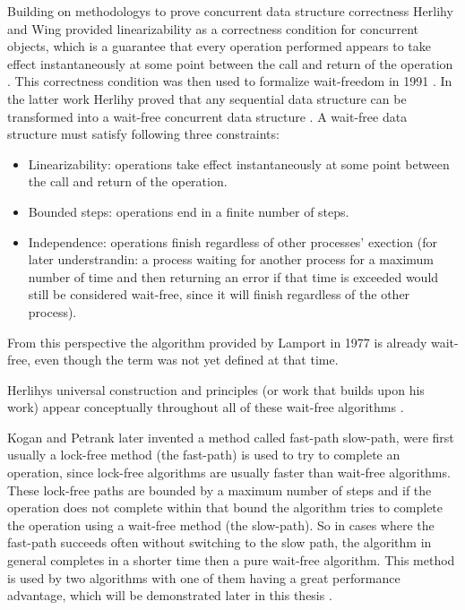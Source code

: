 Building on methodologys to prove concurrent data structure correctness Herlihy and Wing provided linearizability as a correctness condition for concurrent objects, which is a guarantee that every operation performed appears to take effect instantaneously at some point between the call and return of the operation \cite{HerlihyLinearizability}. This correctness condition was then used to formalize wait-freedom in 1991 \cite{herlihy1991wait}. In the latter work Herlihy proved that any sequential data structure can be transformed into a wait-free concurrent data structure \cite{herlihy1991wait}. A wait-free data structure must satisfy following three constraints: 
\begin{itemize}
   \item Linearizability: operations take effect instantaneously at some point between the call and return of the operation.
   \item Bounded steps: operations end in a finite number of steps.
   \item Independence: operations finish regardless of other processes' exection (for later understrandin: a process waiting for another process for a maximum number of time and then returning an error if that time is exceeded would still be considered wait-free, since it will finish regardless of the other process).
\end{itemize}
From this perspective the algorithm provided by Lamport in 1977 is already wait-free, even though the term was not yet defined at that time. \cite{herlihy1991wait,HerlihyLinearizability}

Herlihys universal construction and principles (or work that builds upon his work) appear conceptually throughout all of these wait-free algorithms \cite{Kogan2011WaitFreeQueues,FeldmanDechev2015WaitFreeRingBuffer,kogan2012methodology,FeldmanDechevV2,FeldmanDechevV3,RamalheteQueue,wCQWaitFreeQueue,Verma2013Scalable,FastFetchAndAddWaitFreeQueue,WangCacheCoherent,adampsc,jiffy,JayantiLog,Drescher2015GuardedSections,Mateíspmc,torquati2010singleproducersingleconsumerqueuessharedcache,Aldinucci2012EfficientSync,Wang2013BQueue,MaffioneCacheAware,ffq}. \cite{herlihy1991wait}

Kogan and Petrank later invented a method called fast-path slow-path, were first usually a lock-free method (the fast-path) is used to try to complete an operation, since lock-free algorithms are usually faster than wait-free algorithms. These lock-free paths are bounded by a maximum number of steps and if the operation does not complete within that bound the algorithm tries to complete the operation using a wait-free method (the slow-path). So in cases where the fast-path succeeds often without switching to the slow path, the algorithm in general completes in a shorter time then a pure wait-free algorithm. This method is used by two algorithms with one of them having a great performance advantage, which will be demonstrated later in this thesis \cite{wCQWaitFreeQueue,FastFetchAndAddWaitFreeQueue}. \cite{kogan2012methodology}